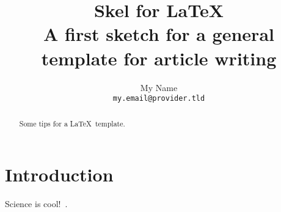 \documentclass[a4paper,12pt,usenames,dvipsnames]{article}
\title{\large\textbf{
\huge Skel for \LaTeX  %
}
\\ A first sketch for a general template for article writing  %
}
\author{
My Name
\\\texttt{
my.email@provider.tld
}}
\date{}
\begin{document}
\maketitle

\begin{abstract}
  Some tips for a \LaTeX\ template.
\end{abstract}

\section{Introduction}
	Science is cool!~\cite{Sagan}.

\printbibliography
\end{document}
